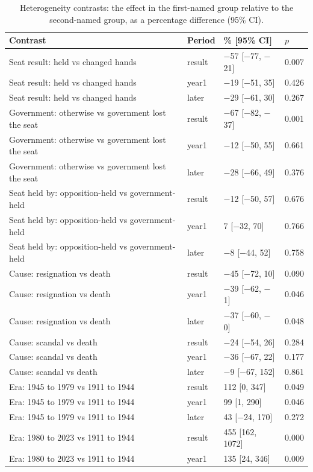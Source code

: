 \documentclass[11pt,a4paper]{article}
\begin{document}
\begin{table}[tbp]\centering\scriptsize\caption{Heterogeneity contrasts: the effect in the first-named group relative to the second-named group, as a percentage difference (95\% CI).}\label{tab:hetfull}\begin{tabular}{p{9.5cm}lll}\toprule Contrast & Period & \% [95\% CI] & $p$\\\midrule
Seat result: held vs changed hands & result & $-$57 [$-$77, $-$21] & 0.007\\
Seat result: held vs changed hands & year1 & $-$19 [$-$51, 35] & 0.426\\
Seat result: held vs changed hands & later & $-$29 [$-$61, 30] & 0.267\\
Government: otherwise vs government lost the seat & result & $-$67 [$-$82, $-$37] & 0.001\\
Government: otherwise vs government lost the seat & year1 & $-$12 [$-$50, 55] & 0.661\\
Government: otherwise vs government lost the seat & later & $-$28 [$-$66, 49] & 0.376\\
Seat held by: opposition-held vs government-held & result & $-$12 [$-$50, 57] & 0.676\\
Seat held by: opposition-held vs government-held & year1 & 7 [$-$32, 70] & 0.766\\
Seat held by: opposition-held vs government-held & later & $-$8 [$-$44, 52] & 0.758\\
Cause: resignation vs death & result & $-$45 [$-$72, 10] & 0.090\\
Cause: resignation vs death & year1 & $-$39 [$-$62, $-$1] & 0.046\\
Cause: resignation vs death & later & $-$37 [$-$60, $-$0] & 0.048\\
Cause: scandal vs death & result & $-$24 [$-$54, 26] & 0.284\\
Cause: scandal vs death & year1 & $-$36 [$-$67, 22] & 0.177\\
Cause: scandal vs death & later & $-$9 [$-$67, 152] & 0.861\\
Era: 1945 to 1979 vs 1911 to 1944 & result & 112 [0, 347] & 0.049\\
Era: 1945 to 1979 vs 1911 to 1944 & year1 & 99 [1, 290] & 0.046\\
Era: 1945 to 1979 vs 1911 to 1944 & later & 43 [$-$24, 170] & 0.272\\
Era: 1980 to 2023 vs 1911 to 1944 & result & 455 [162, 1072] & 0.000\\
Era: 1980 to 2023 vs 1911 to 1944 & year1 & 135 [24, 346] & 0.009\\

\end{tabular}
\end{table}
\end{document}
